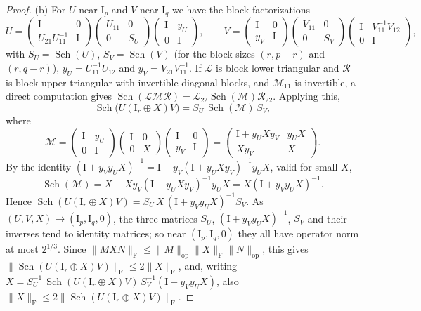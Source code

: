 \documentclass[11pt,a4paper]{article}
\theoremstyle{definition}
\theoremstyle{remark}
\numberwithin{equation}{section}
\newcommand{\Sch}{\operatorname{Sch}}
\newcommand{\id}{\mathrm{I}}
\newcommand{\Fr}[1]{\lVert #1\rVert_{\mathrm F}}
\newcommand{\norm}[1]{\lVert #1\rVert}
\begin{document}
\begin{proof}
(b) For $U$ near $\id_p$ and $V$ near $\id_q$ we have the block factorizations
\[
U=\begin{pmatrix}\id&0\\U_{21}U_{11}^{-1}&\id\end{pmatrix}\begin{pmatrix}U_{11}&0\\0&S_U\end{pmatrix}\begin{pmatrix}\id&y_U\\0&\id\end{pmatrix},\qquad
V=\begin{pmatrix}\id&0\\y_V&\id\end{pmatrix}\begin{pmatrix}V_{11}&0\\0&S_V\end{pmatrix}\begin{pmatrix}\id&V_{11}^{-1}V_{12}\\0&\id\end{pmatrix},
\]
with $S_U=\Sch(U)$, $S_V=\Sch(V)$ (for the block sizes $(r,p-r)$ and $(r,q-r)$), $y_U=U_{11}^{-1}U_{12}$ and $y_V=V_{21}V_{11}^{-1}$. If $\mathcal L$ is block lower triangular and $\mathcal R$ is block upper triangular with invertible diagonal blocks, and $\mathcal M_{11}$ is invertible, a direct computation gives $\Sch(\mathcal L\mathcal M\mathcal R)=\mathcal L_{22}\Sch(\mathcal M)\mathcal R_{22}$. Applying this,
\[
\Sch\bigl(U(\id_r\oplus X)V\bigr)=S_U\,\Sch(\mathcal M)\,S_V,
\]
where
\[
\mathcal M=\begin{pmatrix}\id&y_U\\0&\id\end{pmatrix}\begin{pmatrix}\id&0\\0&X\end{pmatrix}\begin{pmatrix}\id&0\\y_V&\id\end{pmatrix}=\begin{pmatrix}\id+y_UXy_V&y_UX\\Xy_V&X\end{pmatrix}.
\]
By the identity $(\id+y_Vy_UX)^{-1}=\id-y_V(\id+y_UXy_V)^{-1}y_UX$, valid for small $X$,
\[
\Sch(\mathcal M)=X-Xy_V(\id+y_UXy_V)^{-1}y_UX=X(\id+y_Vy_UX)^{-1}.
\]
Hence $\Sch(U(\id_r\oplus X)V)=S_U\,X\,(\id+y_Vy_UX)^{-1}S_V$. As $(U,V,X)\to(\id_p,\id_q,0)$, the three matrices $S_U$, $(\id+y_Vy_UX)^{-1}$, $S_V$ and their inverses tend to identity matrices; so near $(\id_p,\id_q,0)$ they all have operator norm at most $2^{1/3}$. Since $\Fr{MXN}\le\norm M_{\mathrm{op}}\Fr X\norm N_{\mathrm{op}}$, this gives $\Fr{\Sch(U(\id_r\oplus X)V)}\le2\Fr X$, and, writing $X=S_U^{-1}\,\Sch(U(\id_r\oplus X)V)\,S_V^{-1}(\id+y_Vy_UX)$, also $\Fr X\le2\Fr{\Sch(U(\id_r\oplus X)V)}$.
\end{proof}
\end{document}

